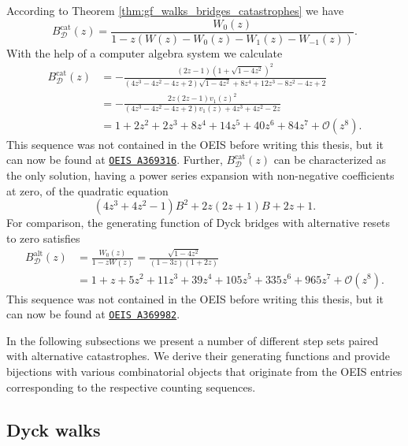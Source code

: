\begin{example}
  According to Theorem \ref{thm:gf_walks_bridges_catastrophes} we have
  $$
  B_\mathcal{D}^\mathrm{cat}(z) = \frac{W_0(z)}{1 - z(W(z) - W_0(z) - W_1(z) - W_{-1}(z))}.
  $$
  With the help of a computer algebra system we calculate
  \begin{align*}
    B_\mathcal{D}^\mathrm{cat}(z) &= -\frac{\left(2 z - 1\right) \left(1+\sqrt{1 - 4z^{2}}\right)^{2}}{\left(4 z^{3}-4 z^{2}-4 z +2\right) \sqrt{1 - 4z^{2}}+8 z^{4}+12 z^{3}-8 z^{2}-4 z +2} \\
    &= -\frac{2z\left(2z - 1\right) v_1(z)^{2}}{\left(4 z^{3}-4 z^{2}-4 z +2\right)v_1(z) +4 z^{3}+4 z^{2}-2 z} \\
    &= 1 + 2z^2 + 2z^3 + 8z^4 + 14z^5 + 40z^6 + 84z^7 + \mathcal{O}(z^8).
  \end{align*}
  This sequence was not contained in the OEIS before writing this thesis, but it can now be found at \href{https://oeis.org/A369316}{\texttt{OEIS A369316}}.
  Further, $B_\mathcal{D}^\mathrm{cat}(z)$ can be characterized as the only solution, having a power series expansion with non-negative coefficients at zero, of the quadratic equation
  \begin{equation*}
    \left(4z^{3} + 4z^{2} - 1\right) B^{2} + 2z \left(2z +1\right) B + 2z + 1.
  \end{equation*}
  For comparison, the generating function of Dyck bridges with alternative resets to zero satisfies
  \begin{align*}
    B_\mathcal{D}^\mathrm{alt}(z) &= \frac{W_0(z)}{1 - zW(z)} 
    = \frac{\sqrt{1 - 4z^2}}{(1 - 3z)(1 + 2z)}\\
    &= 1 + z + 5z^2 + 11z^3 + 39z^4 + 105z^5 + 335z^6 + 965z^7 + \mathcal{O}(z^8).
  \end{align*}
  This sequence was not contained in the OEIS before writing this thesis, but it can now be found at \href{https://oeis.org/A369982}{\texttt{OEIS A369982}}.
\end{example}

In the following subsections we present a number of different step sets paired with alternative catastrophes. We derive their generating functions and provide bijections with various combinatorial objects that originate from the OEIS entries corresponding to the respective counting sequences. 

\subsection{Dyck walks}

